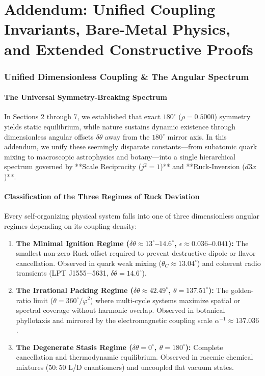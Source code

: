 \documentclass[11pt,a4paper,oneside]{article}
\def\dddot#1{d3#1}%
\def\texttt#1{#1}%
\theoremstyle{definition}
\begin{document}
\part*{\centering\Huge Addendum: Unified Coupling Invariants, Bare-Metal Physics, and Extended Constructive Proofs}

\section{Unified Dimensionless Coupling \& The Angular Spectrum}

\subsection{The Universal Symmetry-Breaking Spectrum}
In Sections 2 through 7, we established that exact $180^\circ$ ($\rho = 0.5000$) symmetry yields static equilibrium, while nature sustains dynamic existence through dimensionless angular offsets $\delta \theta$ away from the $180^\circ$ mirror axis. In this addendum, we unify these seemingly disparate constants—from subatomic quark mixing to macroscopic astrophysics and botany—into a single hierarchical spectrum governed by **Scale Reciprocity ($j^2 = 1$)** and **Ruck-Inversion ($\dddot{x}$)**.

\subsection{Classification of the Three Regimes of Ruck Deviation}
Every self-organizing physical system falls into one of three dimensionless angular regimes depending on its coupling density:

\begin{enumerate}
    \item \textbf{The Minimal Ignition Regime ($\delta \theta \approx 13^\circ$--$14.6^\circ$, $\epsilon \approx 0.036$--$0.041$):} The smallest non-zero Ruck offset required to prevent destructive dipole or flavor cancellation. Observed in quark weak mixing ($\theta_C \approx 13.04^\circ$) and coherent radio transients (\texttt{LPT J1555$-$5631}, $\delta \theta = 14.6^\circ$).
    \item \textbf{The Irrational Packing Regime ($\delta \theta \approx 42.49^\circ$, $\theta = 137.51^\circ$):} The golden-ratio limit ($\theta = 360^\circ / \varphi^2$) where multi-cycle systems maximize spatial or spectral coverage without harmonic overlap. Observed in botanical phyllotaxis and mirrored by the electromagnetic coupling scale $\alpha^{-1} \approx 137.036$.
    \item \textbf{The Degenerate Stasis Regime ($\delta \theta = 0^\circ$, $\theta = 180^\circ$):} Complete cancellation and thermodynamic equilibrium. Observed in racemic chemical mixtures ($50:50$ L/D enantiomers) and uncoupled flat vacuum states.
\end{enumerate}
\end{document}
